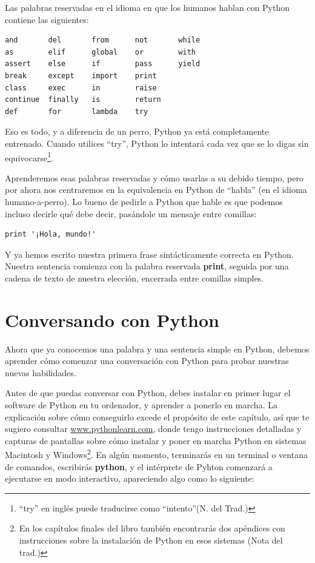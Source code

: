 Las palabras reservadas en el idioma en que los humanos hablan con
Python contiene las siguientes:

\beforeverb
\begin{verbatim}
and       del       from      not       while    
as        elif      global    or        with     
assert    else      if        pass      yield    
break     except    import    print              
class     exec      in        raise              
continue  finally   is        return             
def       for       lambda    try
\end{verbatim}
\afterverb
%
Eso es todo, y a diferencia de un perro, Python ya está completamente entrenado.
Cuando utilices ``try'', Python lo intentará cada vez que se lo digas sin
equivocarse\footnote{``try'' en inglés puede traducirse como ``intento''(N. del Trad.)}.

Aprenderemos esas palabras reservadas y cómo usarlas a su debido tiempo,
pero por ahora nos centraremos en la equivalencia en Python de ``habla''
(en el idioma humano-a-perro). Lo bueno de pedirle a Python que hable
es que podemos incluso decirle qué debe decir, pasándole un mensaje entre comillas:

\beforeverb
\begin{verbatim}
print '¡Hola, mundo!'
\end{verbatim}
\afterverb

Y ya hemos escrito nuestra primera frase sintácticamente correcta en Python.
Nuestra sentencia comienza con la palabra reservada {\bf print}, seguida
por una cadena de texto de nuestra elección, encerrada entre comillas simples.

\section{Conversando con Python}

Ahora que ya conocemos una palabra y una sentencia simple en Python,
debemos aprender cómo comenzar una conversación con Python para probar
nuestras nuevas habilidades.

Antes de que puedas conversar con Python, debes instalar en primer lugar
el software de Python en tu ordenador, y aprender a ponerlo en marcha.
La explicación sobre cómo conseguirlo excede el propósito de este capítulo,
así que te sugiero consultar \url{www.pythonlearn.com}, donde tengo
instrucciones detalladas y capturas de pantallas sobre cómo instalar y poner en marcha
Python en sistemas Macintosh y Windows\footnote{En los capítulos finales del libro también
encontrarás dos apéndices con instrucciones sobre la instalación de Python en esos sistemas (Nota
del trad.)}. En algún momento, terminarás en un terminal
o ventana de comandos, escribirás {\bf python}, y el intérprete de Pyhton
comenzará a ejecutarse en modo interactivo, apareciendo algo como lo siguiente:

